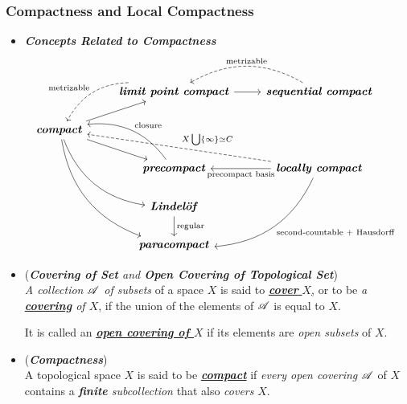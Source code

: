 \documentclass[11pt]{article}
\begin{document}
\subsubsection{Compactness and Local Compactness}
\begin{itemize}
\item  \emph{\textbf{Concepts Related to Compactness}}
\[
  \begin{tikzcd}
   &  \arrow[dl, swap, bend right, dashed, "\text{metrizable}"]   \text{\emph{\textbf{limit point compact}}} \arrow{r}{} & \arrow[l, bend right, dashed, swap,  "\text{metrizable}"]  \text{\emph{\textbf{sequential compact}}}\\
  \text{\emph{\textbf{compact}}}  \arrow{ur}{}  \arrow{dr}{} \arrow[ddr, bend right] \arrow[dddr, bend right] & &\\
  & \arrow[bend right, swap]{ul}{\text{closure}}  \text{\emph{\textbf{precompact}}}    & \arrow{l}{\text{precompact basis}}   \text{\emph{\textbf{locally compact}}}  \arrow[ull,  dashed,  swap, "X \bigcup \set{\infty} \simeq C"]     \arrow[ddl,   bend left,  "\text{second-countable $+$ Hausdorff}"]  \\
 & \text{\emph{\textbf{Lindel{\"o}f}}} \arrow{d}{\text{regular}} & &\\
 & \text{\emph{\textbf{paracompact}}} &  &
  \end{tikzcd}
\] 

\item \begin{definition} (\emph{\textbf{Covering of Set} and \textbf{Open Covering of Topological Set}})\\
\emph{A collection ${\mathscr A}$ of subsets} of a space $X$ is said to \underline{\emph{\textbf{cover}} $X$,} or to be \emph{a \underline{\textbf{covering}} of $X$}, if the union of the elements of ${\mathscr A}$ is equal to $X$. 

It is called an \underline{\emph{\textbf{open covering of $X$}}} if its elements are \emph{open subsets} of $X$.
\end{definition}

\item \begin{definition} (\emph{\textbf{Compactness}})\\
A topological space $X$ is said to be \underline{\emph{\textbf{compact}}} if \emph{every open covering} ${\mathscr A}$ of $X$ contains a \emph{\textbf{finite} subcollection} that also \emph{covers} $X$.
\end{definition}


\end{itemize}
\end{document}
